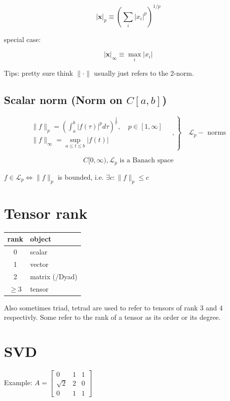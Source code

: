 \documentclass[12pt,a4paper]{article}
\begin{document}
$$|\mathbf{x}|_{p} \equiv\left(\sum_{i}\left|x_{i}\right|^{p}\right)^{1 / p}$$

special case:

$$|\mathbf{x}|_{\infty} \equiv \max _{i}\left|x_{i}\right|$$



Tips: pretty sure think $\|\cdot\|$ usually just refers to the 2-norm.


\subsection*{Scalar norm (Norm on $C[a, b]$)}
\label{sec-1-4}

\begin{equation}
\left.\begin{array}{l}
{\|f\|_{p}=\left(\int_{a}^{b}|f(\tau)|^{p} d \tau\right)^{\frac{1}{p}}, \quad p \in[1, \infty]} \\ 
{\|f\|_{\infty}=\displaystyle\sup _{\scriptscriptstyle a \leq t \leq b}|f(t)| }\end{array} \quad,
\right\} \quad \mathscr{L}_{p}-\text { norms }
\end{equation}

$$
C[0, \infty), \mathscr{L}_{p} \text{ is a Banach space}
$$

$f \in \mathscr{L}_{p} \Leftrightarrow\|f\|_{p}$ is bounded, i.e. $\exists c:\|f\|_{p} \leq c$
\section{Tensor rank}
\label{sec-2}
\begin{table}[h]
\begin{tabular}{cl}
rank                & object   \\
\hline
0                   & scalar   \\
1                   & vector  \\
2                   & matrix (/Dyad)  \\
$\geq 3$ & tensor        
\end{tabular}
\end{table}
Also sometimes  triad, tetrad are used to refer to tensors of 
rank 3 and 4 respectivly. Some refer to the rank of a tensor as
its order or its degree.




\section{SVD}
\label{sec-3}
Example: 
$A=\left[\begin{array}{lll}{0} & {1} & {1} \\ {\sqrt{2}} & {2} & {0} \\ {0} & {1} & {1}\end{array}\right]$
\end{document}
